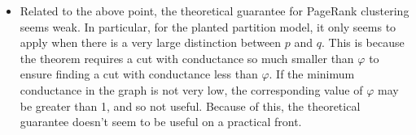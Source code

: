 \documentclass[11pt]{article}
\begin{document}
\begin{itemize}
\item Related to the above point, the theoretical guarantee for PageRank clustering seems weak. In particular, for the planted partition model, it only seems to apply when there is a very large distinction between $p$ and $q$. This is because the theorem requires a cut with conductance so much smaller than $\varphi$ to ensure finding a cut with conductance less than $\varphi$. If the minimum conductance in the graph is not very low, the corresponding value of $\varphi$ may be greater than 1, and so not useful. Because of this, the theoretical guarantee doesn't seem to be useful on a practical front.

\end{itemize}










\end{document}
